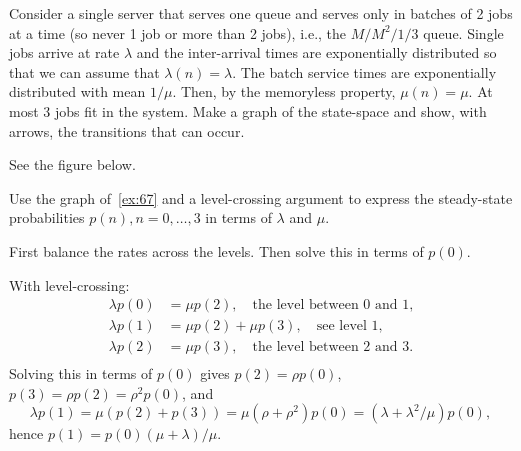 \begin{exercise}
Consider a single server that serves one queue and serves only in batches of 2 jobs at a time (so never 1 job or more than 2 jobs), i.e., the $M/M^2/1/3$ queue.
 Single jobs arrive at rate $\lambda$ and the inter-arrival times are exponentially distributed so that we can assume that $\lambda(n) = \lambda$.
 The batch service times are exponentially distributed with mean $1/\mu$.
 Then, by the memoryless property, $\mu(n) = \mu$.
 At most 3 jobs fit in the system.
 Make a graph of the state-space and show, with arrows, the transitions that can occur.

\begin{solution}
See the figure below.

\end{solution}
\end{exercise}

\begin{exercise}
 Use the graph of~\cref{ex:67} and a level-crossing argument to express the steady-state probabilities $p(n), n=0,\ldots, 3$ in terms of $\lambda$ and $\mu$.
\begin{hint}
First balance the rates across the levels. Then solve this in terms of $p(0)$.
\end{hint}
\begin{solution}
With level-crossing:
 \begin{align*}
 \lambda p(0) &= \mu p(2), \quad\text{the level between 0 and 1,}\\
 \lambda p(1) &= \mu p(2) +\mu p(3), \quad\text{see level 1,}\\
 \lambda p(2) &= \mu p(3), \quad\text{the level between 2 and 3.}\\
 \end{align*}
 Solving this in terms of $p(0)$ gives $p(2) = \rho p(0)$, $p(3) = \rho p(2) = \rho^2p(0)$, and
 \begin{equation*}
 \lambda p(1) = \mu(p(2) + p(3)) = \mu (\rho + \rho^2) p(0) = (\lambda + \lambda^2/\mu) p(0),
 \end{equation*}
hence $p(1) = p(0)(\mu + \lambda)/\mu$. 
\end{solution}
\end{exercise}



